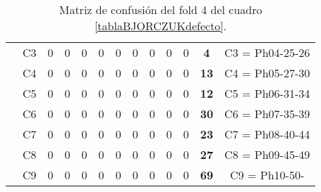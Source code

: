 \begin{table}[H]
{\begin{tabular}{|ccccccccccccc|}
\multicolumn{1}{|c|}{}                                      & \multicolumn{1}{c|}{C3} & \multicolumn{1}{c|}{0}  & \multicolumn{1}{c|}{0}  & \multicolumn{1}{c|}{0}  & \multicolumn{1}{c|}{0}  & \multicolumn{1}{c|}{0}  & \multicolumn{1}{c|}{0}  & \multicolumn{1}{c|}{0}  & \multicolumn{1}{c|}{0}  & \multicolumn{1}{c|}{0}  & \multicolumn{1}{c|}{\textbf{4}}  & C3 = Ph04-25-26   \\ \cline{2-13}
\multicolumn{1}{|c|}{}                                      & \multicolumn{1}{c|}{C4} & \multicolumn{1}{c|}{0}  & \multicolumn{1}{c|}{0}  & \multicolumn{1}{c|}{0}  & \multicolumn{1}{c|}{0}  & \multicolumn{1}{c|}{0}  & \multicolumn{1}{c|}{0}  & \multicolumn{1}{c|}{0}  & \multicolumn{1}{c|}{0}  & \multicolumn{1}{c|}{0}  & \multicolumn{1}{c|}{\textbf{13}} & C4 = Ph05-27-30   \\ \cline{2-13}
\multicolumn{1}{|c|}{}                                      & \multicolumn{1}{c|}{C5} & \multicolumn{1}{c|}{0}  & \multicolumn{1}{c|}{0}  & \multicolumn{1}{c|}{0}  & \multicolumn{1}{c|}{0}  & \multicolumn{1}{c|}{0}  & \multicolumn{1}{c|}{0}  & \multicolumn{1}{c|}{0}  & \multicolumn{1}{c|}{0}  & \multicolumn{1}{c|}{0}  & \multicolumn{1}{c|}{\textbf{12}} & C5 = Ph06-31-34   \\ \cline{2-13}
\multicolumn{1}{|c|}{}                                      & \multicolumn{1}{c|}{C6} & \multicolumn{1}{c|}{0}  & \multicolumn{1}{c|}{0}  & \multicolumn{1}{c|}{0}  & \multicolumn{1}{c|}{0}  & \multicolumn{1}{c|}{0}  & \multicolumn{1}{c|}{0}  & \multicolumn{1}{c|}{0}  & \multicolumn{1}{c|}{0}  & \multicolumn{1}{c|}{0}  & \multicolumn{1}{c|}{\textbf{30}} & C6 = Ph07-35-39   \\ \cline{2-13}
\multicolumn{1}{|c|}{}                                      & \multicolumn{1}{c|}{C7} & \multicolumn{1}{c|}{0}  & \multicolumn{1}{c|}{0}  & \multicolumn{1}{c|}{0}  & \multicolumn{1}{c|}{0}  & \multicolumn{1}{c|}{0}  & \multicolumn{1}{c|}{0}  & \multicolumn{1}{c|}{0}  & \multicolumn{1}{c|}{0}  & \multicolumn{1}{c|}{0}  & \multicolumn{1}{c|}{\textbf{23}} & C7 = Ph08-40-44   \\ \cline{2-13}
\multicolumn{1}{|c|}{}                                      & \multicolumn{1}{c|}{C8} & \multicolumn{1}{c|}{0}  & \multicolumn{1}{c|}{0}  & \multicolumn{1}{c|}{0}  & \multicolumn{1}{c|}{0}  & \multicolumn{1}{c|}{0}  & \multicolumn{1}{c|}{0}  & \multicolumn{1}{c|}{0}  & \multicolumn{1}{c|}{0}  & \multicolumn{1}{c|}{0}  & \multicolumn{1}{c|}{\textbf{27}} & C8 = Ph09-45-49   \\ \cline{2-13}
\multicolumn{1}{|c|}{}                                      & \multicolumn{1}{c|}{C9} & \multicolumn{1}{c|}{0}  & \multicolumn{1}{c|}{0}  & \multicolumn{1}{c|}{0}  & \multicolumn{1}{c|}{0}  & \multicolumn{1}{c|}{0}  & \multicolumn{1}{c|}{0}  & \multicolumn{1}{c|}{0}  & \multicolumn{1}{c|}{0}  & \multicolumn{1}{c|}{0}  & \multicolumn{1}{c|}{\textbf{69}} & C9 = Ph10-50-     \\ \hline
\end{tabular}%
}
\caption{Matriz de confusión del fold 4 del cuadro \ref{tablaBJORCZUKdefecto}.}
\end{table}

